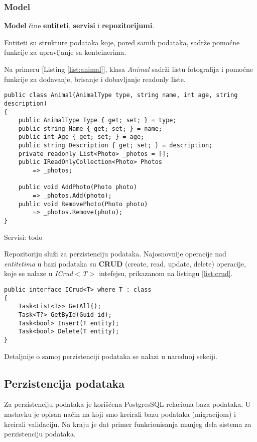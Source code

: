 \subsubsection*{Model}
\par \textbf{Model} čine \textbf{entiteti}, \textbf{servisi} i \textbf{repozitorijumi}. 
\par Entiteti su strukture podataka koje, pored samih podataka, sadrže pomoćne funkcije za upravljanje sa konteinerima. 
\par Na primeru [Listing \ref{list:animal}], klasa \textit{Animal} sadrži listu fotografija i pomoćne funkcije za dodavanje, brisanje i dobavljanje
readonly liste.
\begin{lstlisting}[caption={Primer entiteta}, captionpos=b, label=list:animal]
public class Animal(AnimalType type, string name, int age, string description)
{
    public AnimalType Type { get; set; } = type;
    public string Name { get; set; } = name;
    public int Age { get; set; } = age;
    public string Description { get; set; } = description;
    private readonly List<Photo> _photos = [];
    public IReadOnlyCollection<Photo> Photos 
        => _photos;

    public void AddPhoto(Photo photo) 
        => _photos.Add(photo);
    public void RemovePhoto(Photo photo) 
        => _photos.Remove(photo);
}
\end{lstlisting}
\par Servisi: todo
\par Repozitoriju služi za perzistenciju podataka. Najosnovnije operacije nad \textit{entitetima} u bazi podataka su \textbf{CRUD} (create, read, update, delete) 
operacije, koje se nalaze u \textit{ICrud$<$T$>$} intefejsu, prikazanom na listingu \ref{list:crud}.
\begin{lstlisting}[caption={ICrud$<$T$>$ interfejs}, captionpos=b, label={list:crud}]
public interface ICrud<T> where T : class
{
    Task<List<T>> GetAll();
    Task<T?> GetById(Guid id);
    Task<bool> Insert(T entity);
    Task<bool> Delete(T entity);
}
\end{lstlisting}
\par Detaljnije o samoj perzistenciji podataka se nalazi u narednoj sekciji.
\subsection{Perzistencija podataka}
\par Za perzistenciju podataka je korišćena PostgresSQL relaciona baza podataka. U nastavku je opisan način na koji smo kreirali bazu podataka (migracijom)
i kreirali validaciju. Na kraju je dat primer funkcionisanja manjeg dela sistema za perzistenciju podataka.
